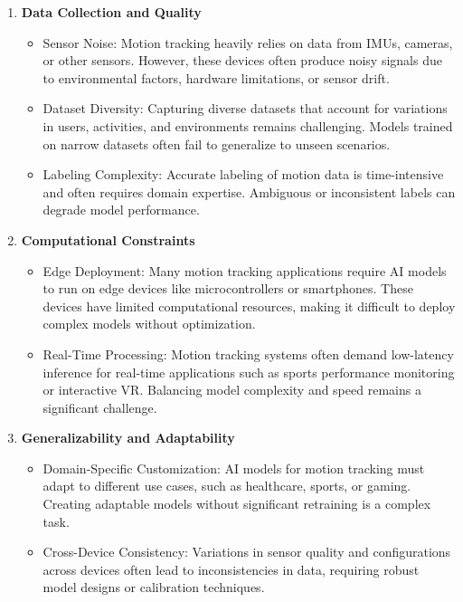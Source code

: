 \begin{enumerate}
    \item \textbf{Data Collection and Quality}
        \begin{itemize}
            \item Sensor Noise: Motion tracking heavily relies on data from IMUs, cameras, or other sensors. However, these devices often produce noisy signals due to environmental factors, hardware limitations, or sensor drift.
            \item Dataset Diversity: Capturing diverse datasets that account for variations in users, activities, and environments remains challenging. Models trained on narrow datasets often fail to generalize to unseen scenarios.
            \item Labeling Complexity: Accurate labeling of motion data is time-intensive and often requires domain expertise. Ambiguous or inconsistent labels can degrade model performance.
        \end{itemize}
    

    \item \textbf{Computational Constraints}
        \begin{itemize}
            \item Edge Deployment: Many motion tracking applications require AI models to run on edge devices like microcontrollers or smartphones. These devices have limited computational resources, making it difficult to deploy complex models without optimization.
            \item Real-Time Processing: Motion tracking systems often demand low-latency inference for real-time applications such as sports performance monitoring or interactive VR. Balancing model complexity and speed remains a significant challenge.
        \end{itemize}

    \item \textbf{Generalizability and Adaptability}
        \begin{itemize}
            \item Domain-Specific Customization: AI models for motion tracking must adapt to different use cases, such as healthcare, sports, or gaming. Creating adaptable models without significant retraining is a complex task.
            \item Cross-Device Consistency: Variations in sensor quality and configurations across devices often lead to inconsistencies in data, requiring robust model designs or calibration techniques.
        \end{itemize}


\end{enumerate}
